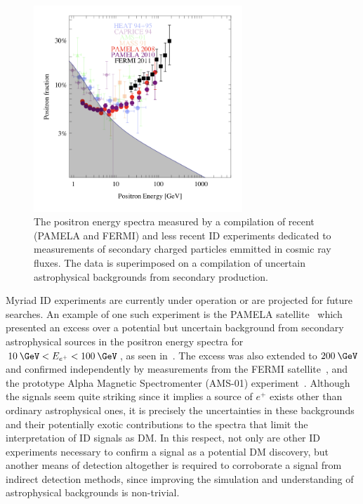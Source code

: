 \begin{figure}
  \includegraphics[width=0.7\textwidth]{figs/pamela.png}
  \caption{The positron energy spectra measured by a compilation of recent (PAMELA and FERMI) and less recent ID experiments dedicated to measurements of secondary charged particles emmitted in cosmic ray fluxes. The data is superimposed on a compilation of uncertain astrophysical backgrounds from secondary production.~\cite{Cirelli:2012tf}}
  \label{fig:positronflux}
\end{figure}

Myriad ID experiments are currently under operation or are projected for future searches. An example of one such experiment is the PAMELA satellite~\cite{Adriani:2008zr} which presented an excess over a potential but uncertain background from secondary astrophysical sources in the positron energy spectra for $10\:\GeV < E_{e^+} < 100\:\GeV$, as seen in~. The excess was also extended to $200\:\GeV$ and confirmed independently by measurements from the FERMI satellite~\cite{PhysRevLett.108.011103}, and the prototype Alpha Magnetic Spectromenter (AMS-01) experiment~\cite{Aguilar:2007yf}. Although the signals seem quite striking since it implies a source of $e^+$ exists other than ordinary astrophysical ones, it is precisely the uncertainties in these backgrounds and their potentially exotic contributions to the spectra that limit the interpretation of ID signals as DM. In this respect, not only are other ID experiments necessary to confirm a signal as a potential DM discovery, but another means of detection altogether is required to corroborate a signal from indirect detection methods, since improving the simulation and understanding of astrophysical backgrounds is non-trivial.

